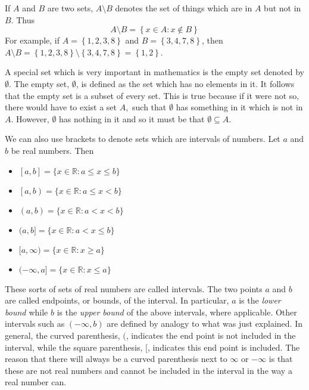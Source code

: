 If $A$ and $B$ are two sets, $A\setminus B$\index{$\setminus$} denotes the set of things which
are in $A$ but not in $B.$ Thus
\begin{equation*}
A\setminus B =  \left\{ x\in A:x\notin B\right\} 
\end{equation*}
For example, if $A = \left\{1,2,3,8 \right\}$ and $B = \left\{ 3,4,7,8 \right\}$, then $A \setminus B = \left\{ 1,2,3,8\right\} \setminus 
\left\{ 3,4,7,8 \right\} =\left\{1,2 \right\}$.

A special set which is very important in mathematics is the empty set denoted by $\emptyset .$ The empty set, $\emptyset $, is
defined as the set which has no elements in it. It follows that the empty set is a subset of every set. 
This is true because if it were not so, there would have to exist a set $A,$ such that $\emptyset $
has something in it which is not in $A.$ However, $\emptyset $ has nothing
in it and so it must be that $\emptyset \subseteq A.$

We can also use brackets to denote sets which are intervals of numbers. Let $a$ and $b$ be real numbers. Then

\begin{itemize}
\item
$\left[ a,b\right] = \{x \in \mathbb{R}: a\leq x\leq b \}$

\item $\left[a,b \right) = \{x \in \mathbb{R}: a\leq x<b \}$ 

\item $\left( a,b\right) = \{x \in \mathbb{R}: a<x<b \}$ 

\item $(a,b] = \{ x \in \mathbb{R}: a<x\leq b \}$

\item  $[a,\infty ) = \{x \in \mathbb{R}: x\geq a \}$ 

\item $(-\infty ,a] = \{x \in \mathbb{R}: x \leq a \}$ 
\end{itemize}

These sorts of sets of real
numbers are called intervals. The two points $a$ and $b$ are called
endpoints, or bounds, of the interval. In particular, $a$ is the {\em lower bound \em}  while $b$ is the {\em upper bound \em} of the above
intervals, where applicable. Other intervals such as $\left( -\infty ,b\right) $
are defined by analogy to what was just explained.
 In general, the curved
parenthesis, $($, indicates the end point is not included in the interval, while
the square parenthesis, $[$, indicates this end point is included. The reason that
there will always be a curved parenthesis next to $\infty $ or $-\infty $ is
that these are not real numbers and cannot be included in the interval in the way a real number can. 

